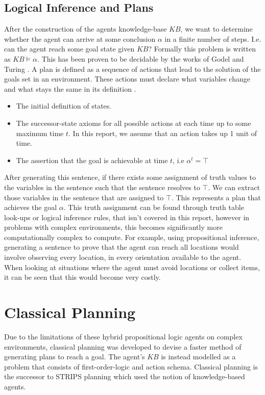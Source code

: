 \newpage
\subsection{Logical Inference and Plans}
After the construction of the agents knowledge-base $KB$, we want to determine whether the agent can arrive at some conclusion $\alpha$ in a finite number of steps. I.e. can the agent reach some goal state given $KB$? Formally this problem is written as $KB \models \alpha$. This has been proven to be decidable by the works of Godel and Turing \cite[Chapter 7]{russell2016artificial}. A plan is defined as a sequence of actions that lead to the solution of the goals set in an environment. These actions must declare what variables change and what stays the same in its definition \cite[Chapter 7]{russell2016artificial}.

\begin{itemize}
    \item The initial definition of states.
    \item The successor-state axioms for all possible actions at each time up to some maximum time $t$. In this report, we assume that an action takes up 1 unit of time.
    \item The assertion that the goal is achievable at time $t$, i.e $\alpha^t = \top$
\end{itemize}

\noindent After generating this sentence, if there exists some assignment of truth values to the variables in the sentence such that the sentence resolves to $\top$. We can extract those variables in the sentence that are assigned to $\top$. This represents a plan that achieves the goal $\alpha$. \cite[Chapter 7]{russell2016artificial} This truth assignment can be found through truth table look-ups or logical inference rules, that isn't covered in this report, however in problems with complex environments, this becomes significantly more computationally complex to compute. For example, using propositional inference, generating a sentence to prove that the agent can reach all locations would involve observing every location, in every orientation available to the agent. When looking at situations where the agent must avoid locations or collect items, it can be seen that this would become very costly.

\section{Classical Planning}
Due to the limitations of these hybrid propositional logic agents on complex environments, classical planning was developed to devise a faster method of generating plans to reach a goal. The agent's $KB$ is instead modelled as a problem that consists of first-order-logic and action schema. \cite[Chapter 10]{russell2016artificial} Classical planning is the successor to STRIPS planning which used the notion of knowledge-based agents. \cite{suárezhernández2021strips}

